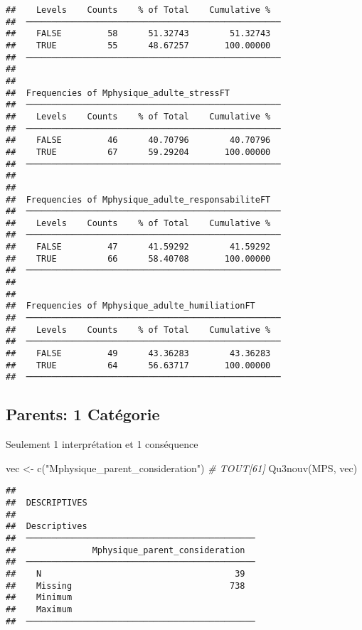 \documentclass[
]{article}
\newenvironment{Shaded}{\begin{snugshade}}{\end{snugshade}}
\newcommand{\CommentTok}[1]{\textcolor[rgb]{0.56,0.35,0.01}{\textit{#1}}}
\newcommand{\FunctionTok}[1]{\textcolor[rgb]{0.00,0.00,0.00}{#1}}
\newcommand{\NormalTok}[1]{#1}
\newcommand{\OtherTok}[1]{\textcolor[rgb]{0.56,0.35,0.01}{#1}}
\newcommand{\StringTok}[1]{\textcolor[rgb]{0.31,0.60,0.02}{#1}}
\begin{document}
\begin{verbatim}
##    Levels    Counts    % of Total    Cumulative %   
##  ────────────────────────────────────────────────── 
##    FALSE         58      51.32743        51.32743   
##    TRUE          55      48.67257       100.00000   
##  ────────────────────────────────────────────────── 
## 
## 
##  Frequencies of Mphysique_adulte_stressFT           
##  ────────────────────────────────────────────────── 
##    Levels    Counts    % of Total    Cumulative %   
##  ────────────────────────────────────────────────── 
##    FALSE         46      40.70796        40.70796   
##    TRUE          67      59.29204       100.00000   
##  ────────────────────────────────────────────────── 
## 
## 
##  Frequencies of Mphysique_adulte_responsabiliteFT   
##  ────────────────────────────────────────────────── 
##    Levels    Counts    % of Total    Cumulative %   
##  ────────────────────────────────────────────────── 
##    FALSE         47      41.59292        41.59292   
##    TRUE          66      58.40708       100.00000   
##  ────────────────────────────────────────────────── 
## 
## 
##  Frequencies of Mphysique_adulte_humiliationFT      
##  ────────────────────────────────────────────────── 
##    Levels    Counts    % of Total    Cumulative %   
##  ────────────────────────────────────────────────── 
##    FALSE         49      43.36283        43.36283   
##    TRUE          64      56.63717       100.00000   
##  ──────────────────────────────────────────────────
\end{verbatim}

\hypertarget{parents-1-catuxe9gorie}{%
\subsection{Parents: 1 Catégorie}\label{parents-1-catuxe9gorie}}

Seulement 1 interprétation et 1 conséquence

\begin{Shaded}
\begin{Highlighting}[]
\NormalTok{vec }\OtherTok{\textless{}{-}} \FunctionTok{c}\NormalTok{(}\StringTok{"Mphysique\_parent\_consideration"}\NormalTok{)  }\CommentTok{\# TOUT[61]}
\FunctionTok{Qu3nouv}\NormalTok{(MPS, vec)}
\end{Highlighting}
\end{Shaded}

\begin{verbatim}
## 
##  DESCRIPTIVES
## 
##  Descriptives                                  
##  ───────────────────────────────────────────── 
##               Mphysique_parent_consideration   
##  ───────────────────────────────────────────── 
##    N                                      39   
##    Missing                               738   
##    Minimum                                     
##    Maximum                                     
##  ─────────────────────────────────────────────
\end{verbatim}
\end{document}
